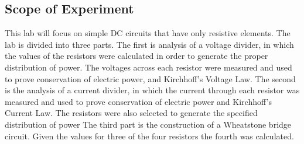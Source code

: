\subsection{Scope of Experiment}
\label{sub:Scope of Experiment}
This lab will focus on simple DC circuits that have only resistive elements. The lab
is divided into three parts. The first is analysis of a voltage divider, in which the values of
the resistors were calculated in order to generate the proper distribution of power.  The voltages
across each resistor were measured and used to prove conservation of electric power,
and Kirchhoff's Voltage Law. The second is the analysis of a current divider, in which the current
through each resistor was measured and used to prove conservation of electric power and Kirchhoff's
Current Law. The resistors were also selected to generate the specified distribution of power
The third part is the construction of a Wheatstone bridge circuit. Given the values for three
of the four resistors the fourth was calculated.
